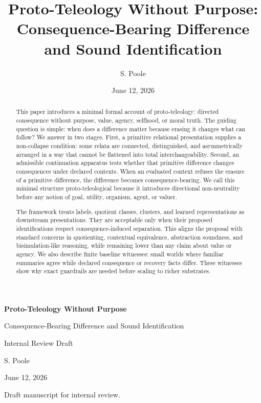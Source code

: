 \documentclass[11pt]{article}
\title{Proto-Teleology Without Purpose:\\
Consequence-Bearing Difference and Sound Identification}
\author{S. Poole}
\date{June 12, 2026}
\begin{document}
\begin{titlepage}
\centering
\vspace*{1.2in}
{\Huge\bfseries Proto-Teleology Without Purpose\par}
\vspace{0.35in}
{\LARGE Consequence-Bearing Difference and Sound Identification\par}
\vspace{0.85in}
{\Large Internal Review Draft\par}
\vfill
{\large S. Poole\par}
\vspace{0.2in}
{\large June 12, 2026\par}
\vspace{0.7in}
{\small Draft manuscript for internal review.\par}
\end{titlepage}

\begin{abstract}
This paper introduces a minimal formal account of proto-teleology: directed
consequence without purpose, value, agency, selfhood, or moral truth. The
guiding question is simple: when does a difference matter because erasing it
changes what can follow? We answer in two stages. First, a primitive relational
presentation supplies a non-collapse condition: some relata are connected,
distinguished, and asymmetrically arranged in a way that cannot be flattened
into total interchangeability. Second, an admissible continuation apparatus
tests whether that primitive difference changes consequences under declared
contexts. When an evaluated context refuses the erasure of a primitive
difference, the difference becomes consequence-bearing. We call this minimal
structure proto-teleological because it introduces directional non-neutrality
before any notion of goal, utility, organism, agent, or valuer.

The framework treats labels, quotient classes, clusters, and learned
representations as downstream presentations. They are acceptable only when
their proposed identifications respect consequence-induced separation. This
aligns the proposal with standard concerns in quotienting, contextual
equivalence, abstraction soundness, and bisimulation-like reasoning, while
remaining lower than any claim about value or agency. We also describe finite
baseline witnesses: small worlds where familiar summaries agree while declared
consequence or recovery facts differ. These witnesses show why exact guardrails
are needed before scaling to richer substrates.
\end{abstract}
\end{document}
